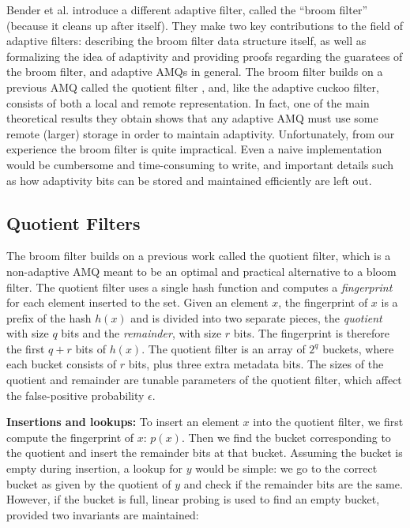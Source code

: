 \documentclass[../paper.tex]{subfiles}
\begin{document}
 Bender et al. \cite{broom-filter} introduce a different adaptive filter, called the ``broom filter''
(because it cleans up after itself). They make two key contributions to the
field of adaptive filters: describing the broom filter data structure itself,
as well as formalizing the idea of adaptivity and providing proofs regarding the guaratees
of the broom filter, and adaptive AMQs in general. The broom filter builds on
a previous AMQ called the quotient filter \cite{quotient-filter}, and, like the adaptive
cuckoo filter, consists of both a local and remote representation. In fact, one
of the main theoretical results they obtain shows that any adaptive AMQ must use
some remote (larger) storage in order to maintain adaptivity. Unfortunately, from
our experience the broom filter is quite impractical. Even a naive implementation
would be cumbersome and time-consuming to write, and important details such as
how adaptivity bits can be stored and maintained efficiently are left out.

\subsection{Quotient Filters}

The broom filter builds on a previous work called the quotient filter, which
is a non-adaptive AMQ meant to be an optimal and practical alternative to a bloom filter.
The quotient filter uses a single hash function and computes a \textit{fingerprint} for
each element inserted to the set. Given an element $x$, the fingerprint of $x$ is a
prefix of the hash $h(x)$ and is divided into two separate pieces, the \textit{quotient} with
size $q$ bits and the \textit{remainder}, with size $r$ bits. The fingerprint is therefore
the first $q+r$ bits of $h(x)$.
The quotient filter is an array of $2^q$ buckets, where
each bucket consists of $r$ bits, plus three extra metadata bits.
The sizes of the quotient and remainder are tunable
parameters of the quotient filter, which affect the false-positive probability $\epsilon$.

\textbf{Insertions and lookups:} To insert an element $x$ into the quotient filter, we first
compute the fingerprint of $x$: $p(x)$. Then we find the bucket corresponding
to the quotient and insert the remainder bits at that bucket. Assuming the bucket
is empty during insertion, a lookup for $y$ would be simple: we go to the correct bucket as given
by the quotient of $y$ and check if the remainder bits are the same. However, if the bucket is
full, linear probing is used to find an empty bucket, provided two invariants are maintained:
\end{document}
